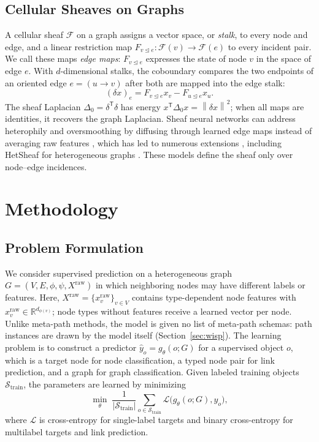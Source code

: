 \documentclass{article}
\newcommand{\R}{\mathbb{R}}
\newcommand{\norm}[1]{\left\lVert #1\right\rVert}
\newcommand{\transpose}{\mathsf{T}}
\newcommand{\inc}{\trianglelefteq}
\begin{document}
\subsection{Cellular Sheaves on Graphs}
A cellular sheaf $\mathcal{F}$ on a graph assigns a vector space, or \emph{stalk}, to every node and edge, and a linear restriction map $F_{v\inc e}:\mathcal{F}(v)\rightarrow\mathcal{F}(e)$ to every incident pair. We call these maps \emph{edge maps}: $F_{v\inc e}$ expresses the state of node $v$ in the space of edge $e$. With $d$-dimensional stalks, the coboundary compares the two endpoints of an oriented edge $e=(u\rightarrow v)$ after both are mapped into the edge stalk:
\begin{equation}
  (\delta x)_e = F_{v\inc e}x_v-F_{u\inc e}x_u .
  \label{eq:coboundary}
\end{equation}
The sheaf Laplacian $\Delta_0=\delta^{\transpose}\delta$ has energy $x^{\transpose}\Delta_0x=\norm{\delta x}^2$; when all maps are identities, it recovers the graph Laplacian. Sheaf neural networks can address heterophily and oversmoothing by diffusing through learned edge maps instead of averaging raw features \cite{hansen2020sheaf,bodnar2022neural}, which has led to numerous extensions \cite{barbero2022sheaf,fiorini2025sheaves,ribeiro2026cooperative}, including HetSheaf for heterogeneous graphs \cite{braithwaite2024heterogeneous}. These models define the sheaf only over node--edge incidences.

\section{Methodology}
\label{sec:method}

\subsection{Problem Formulation}
We consider supervised prediction on a heterogeneous graph $G=(V,E,\phi,\psi,X^{\mathrm{raw}})$ in which neighboring nodes may have different labels or features. Here, $X^{\mathrm{raw}}=\{x_v^{\mathrm{raw}}\}_{v\in V}$ contains type-dependent node features with $x_v^{\mathrm{raw}}\in\R^{d_{\phi(v)}}$; node types without features receive a learned vector per node. Unlike meta-path methods, the model is given no list of meta-path schemas: path instances are drawn by the model itself (Section~\ref{sec:wisp}). The learning problem is to construct a predictor $\hat{y}_o=g_\theta(o;G)$ for a supervised object $o$, which is a target node for node classification, a typed node pair for link prediction, and a graph for graph classification. Given labeled training objects $\mathcal{S}_{\mathrm{train}}$, the parameters are learned by minimizing
\begin{equation}
  \min_\theta\;
  \frac{1}{|\mathcal{S}_{\mathrm{train}}|}
  \sum_{o\in\mathcal{S}_{\mathrm{train}}}
  \mathcal{L}\bigl(g_\theta(o;G),y_o\bigr),
  \label{eq:objective}
\end{equation}
where $\mathcal{L}$ is cross-entropy for single-label targets and binary cross-entropy for multilabel targets and link prediction.
\end{document}

